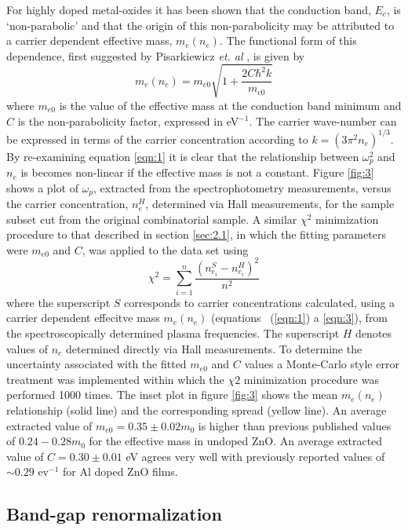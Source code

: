 \documentclass[preprint]{elsarticle}
\begin{document}
For highly doped metal-oxides it has been shown that the conduction band, $E_c$, is `non-parabolic' and that the origin of this non-parabolicity may be attributed to a carrier dependent effective mass, $m_e(n_e)$. The functional form of this dependence, first suggested by Pisarkiewicz \textit{et. al} \cite{Pisarkiewicz1990}, is given by
\begin{equation}
\label{eqn:3}
m_e(n_e) = m_{e0}\sqrt{1+\frac{2C\hbar^2k}{m_{e0}}}
\end{equation}
where $m_{e0}$ is the value of the effective mass at the conduction band minimum and $C$ is the non-parabolicity factor, expressed in eV$^{-1}$. The carrier wave-number can be expressed in terms of the carrier concentration according to $k = (3\pi^2n_e)^{1/3}$. By re-examining equation \ref{eqn:1} it is clear that the relationship between $\omega_p^2$ and $n_e$ is becomes non-linear if the effective mass is not a constant. Figure \ref{fig:3} shows a plot of $\omega_{p}$, extracted from the spectrophotometry measurements, versus the carrier concentration, $n_e^H$, determined via Hall measurements, for the sample subset cut from the original combinatorial sample. A similar $\chi^2$ minimization procedure to that described in section \ref{sec:2.1}, in which the fitting parameters were $m_{e0}$ and $C$, was applied to the data set using
\begin{equation}\label{eqn:4}
\chi^2 = \sum_{i=1}^n\frac{(n_{e_i}^S-n_{e_i}^H)^2}{n^2}
\end{equation}
where the superscript $S$ corresponds to carrier concentrations calculated, using a carrier dependent effecitve mass $m_e(n_e)$ (equations ~(\ref{eqn:1}) a \ref{eqn:3}), from the spectroscopically determined plasma frequencies. The superscript $H$ denotes values of $n_e$ determined directly via Hall measurements. To determine the uncertainty associated with the fitted $m_{e0}$ and $C$ values a Monte-Carlo style error treatment \cite{Mendelsberg2009} was implemented within which the $\chi2$ minimization procedure was performed 1000 times. The inset plot in figure \ref{fig:3} shows the mean $m_e(n_e)$ relationship (solid line) and the corresponding spread (yellow line). An average extracted value of $m_{e0} = 0.35\pm0.02m_0$ is higher than previous published values of $0.24 - 0.28 m_0$ for the effective mass in undoped ZnO. An average extracted value of $C=0.30\pm0.01$ eV agrees very well with previously reported values of $\sim0.29$ ev$^{-1}$ \cite{Ruske2009, Ellmer2001} for Al doped ZnO films.

\subsection{ Band-gap renormalization}
\label{sec:2.3}
\end{document}
